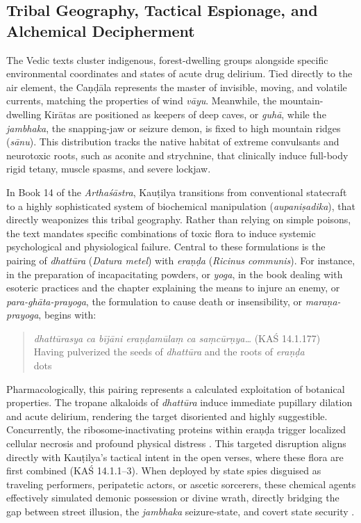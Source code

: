 \documentclass[11pt,twoside,letterpaper]{article}
\begin{document}
\subsection{Tribal Geography, Tactical Espionage, and Alchemical Decipherment}
The Vedic texts cluster indigenous, forest-dwelling groups alongside specific environmental coordinates and states of acute drug delirium. Tied directly to the air element, the Caṇḍāla represents the master of invisible, moving, and volatile currents, matching the properties of wind \textit{vāyu}. Meanwhile, the mountain-dwelling Kirātas are positioned as keepers of deep caves, or \textit{guhā}, while the \textit{jambhaka}, the snapping-jaw or seizure demon, is fixed to high mountain ridges (\textit{sānu}). This distribution tracks the native habitat of extreme convulsants and neurotoxic roots, such as aconite and strychnine, that clinically induce full-body rigid tetany, muscle spasms, and severe lockjaw. 

In Book 14 of the \textit{Arthaśāstra}, Kauṭilya transitions from conventional statecraft to a highly sophisticated system of biochemical manipulation (\textit{aupaniṣadika}), that directly weaponizes this tribal geography. Rather than relying on simple poisons, the text mandates specific combinations of toxic flora to induce systemic psychological and physiological failure. Central to these formulations is the pairing of \textit{dhattūra} (\textit{Datura metel}) with \textit{eraṇḍa} (\textit{Ricinus communis}). For instance, in the preparation of incapacitating powders, or \textit{yoga}, in the book dealing with esoteric practices and the chapter explaining the means to injure an enemy, or \textit{para-ghāta-prayoga}, the formulation to cause death or insensibility, or \textit{maraṇa-prayoga}, begins with:

\begin{quote}
\textit{dhattūrasya ca bījāni eraṇḍamūlaṃ ca saṃcūrṇya\dots}  (KAŚ 14.1.177) \\
Having pulverized the seeds of \textit{dhattūra} and the roots of \textit{eraṇḍa}\\dots\\
\end{quote}

Pharmacologically, this pairing represents a calculated exploitation of botanical properties. The tropane alkaloids of \textit{dhattūra} induce immediate pupillary dilation and acute delirium, rendering the target disoriented and highly suggestible. Concurrently, the ribosome-inactivating proteins within eraṇḍa trigger localized cellular necrosis and profound physical distress \citep{toxicology_datura, rip_necrosis,scopolamine_suggest}. This targeted disruption aligns directly with Kauṭilya's tactical intent in the open verses, where these flora are first combined (KAŚ 14.1.1--3). When deployed by state spies disguised as traveling performers, peripatetic actors, or ascetic sorcerers, these chemical agents effectively simulated demonic possession or divine wrath, directly bridging the gap between street illusion, the \textit{jambhaka} seizure-state, and covert state security \citep{kangle1972, olivelle2013}.
\end{document}
